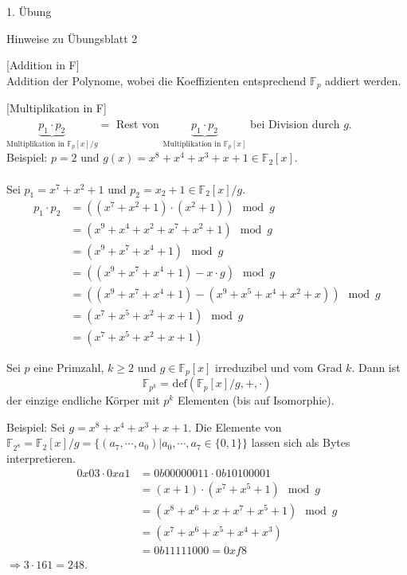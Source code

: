 \begin{section}{1. Übung}
\begin{subsection}{Hinweise zu Übungsblatt 2}
\begin{enumerate}
    \begin{satz}{[Addition in F]} \\
      Addition der Polynome, wobei die Koeffizienten entsprechend $\mathbb{F}_p$ addiert werden. 
    \end{satz}
    \begin{satz}{[Multiplikation in F]} \\
      $\underbrace{p_1 \cdot p_2}_{\text{Multiplikation in }\mathbb{F}_p[x]/g} = $ Rest von $\underbrace{p_1 \cdot p_2}_{\text{Multiplikation in }\mathbb{F}_p[x]} $ bei Division durch $g$. \\
      Beispiel: $p = 2$ und $g(x) = x^8+x^4+x^3+x+1 \in \mathbb{F}_2[x]$. \\ \\
      Sei $p_1 = x^7+x^2+1$ und $p_2 = x_2 +1 \in \mathbb{F}_2[x]/g$.
      \begin{align*}
       p_1 \cdot p_2 & = ((x^7+x^2+1)\cdot(x^2+1)) \mod g \\
       & = (x^9+x^4+x^2+x^7+x^2+1) \mod g \\
       & = (x^9+x^7+x^4+1)  \mod g\\
       & = ((x^9+x^7+x^4+1) -x\cdot g ) \mod g\\
       & = ((x^9+x^7+x^4+1)-(x^9+x^5+x^4+x^2+x)) \mod g \\
       & = (x^7+x^5+x^2+x+1) \mod g \\
       & = (x^7+x^5+x^2+x+1)
      \end{align*}
    \end{satz}

    \begin{satz}
     Sei $p$ eine Primzahl, $k \geq 2$ und $g \in \mathbb{F}_p[x]$ irreduzibel und vom Grad $k$. Dann ist
     \[\mathbb{F}_{p^k} =_{}\text{def} (\mathbb{F}_p[x]/g, +, \cdot)\]
     der einzige endliche Körper mit $p^k$ Elementen (bis auf Isomorphie).
    \end{satz}
    
    Beispiel: Sei $g = x^8+x^4+x^3+x+1$. Die Elemente von $\mathbb{F}_{2^8} = \mathbb{F}_2[x]/g = \{(a_7, \cdots, a_0) | a_0,\cdots , a_7 \in \{0,1\}\}$ lassen sich als Bytes interpretieren.
    \begin{align*}
     0x03 \cdot 0xa1 & = 0b00000011 \cdot 0b10100001 \\
     & = (x+1) \cdot (x^7+x^5+1) \mod g \\
     & = (x^8+x^6+x+x^7+x^5+1)  \mod g \\
     & = (x^7+x^6+x^5+x^4+x^3) \\
     & = 0b11111000 = 0xf8
    \end{align*}
    $\Rightarrow 3 \cdot 161 = 248$.
   \end{enumerate}
  \end{subsection}
\end{section}
